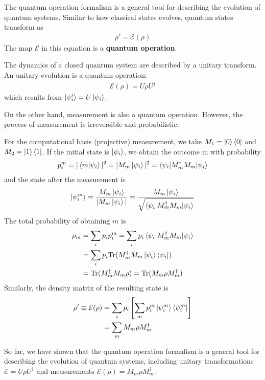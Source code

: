 The quantum operation formalism is a general tool for describing the evolution of quantum systems. Similar to how classical states evolves, quantum states transform as
\begin{align*}
    \rho'=\mathcal{E}(\rho)
\end{align*}
The map $\mathcal{E}$ in this equation is a \textbf{quantum operation}.

The dynamics of a closed quantum system are described by a unitary transform. An unitary evolution is a quantum operation:
\begin{align*}
    \mathcal{E}(\rho)=U\rho U^\dagger
\end{align*}
which results from $\ket{\psi_i'}=U\ket{\psi_i}$. 

On the other hand, measurement is also a quantum operation. However, the process of measurement is irreversible and probabilistic. 

For the computational basis (projective) measurement, we take $M_1 = \ket{0}\bra{0}$ and $M_2 = \ket{1}\bra{1}$. If the initial state is $\ket{\psi_i}$, we obtain the outcome m with probability
\begin{align*}
    p_i^m=|\braket{m|\psi_i}|^2=|M_m\ket{\psi_i}|^2=\braket{\psi_i|M_m^\dagger M_m|\psi_i}
\end{align*}
and the state after the measurement is
\begin{align*}
    \ket{\psi_i^m}=\frac{M_m\ket{\psi_i}}{|M_m\ket{\psi_i}|}=\frac{M_m\ket{\psi_i}}{\sqrt{\braket{\psi_i|M_m^\dagger M_m|\psi_i}}}
\end{align*}
The total probability of obtaining $m$ is
\begin{align*}
    \rho_m&=\sum_i p_i p_i^m=\sum_i p_i \braket{\psi_i|M_m^\dagger M_m|\psi_i}\\
    &=\sum_i p_i \mathrm{Tr}(M_m^\dagger M_m \ket{\psi_i}\bra{\psi_i})\\
    &=\mathrm{Tr}(M_m^\dagger M_m \rho)=\mathrm{Tr}(M_m\rho M_m^\dagger)
\end{align*}
Similarly, the density matrix of the resulting state is
\begin{align*}
    \rho'\equiv\mathcal{E}(\rho)&=\sum_i p_i\left[ \sum_m p_i^m \ket{\psi_i^m}\bra{\psi_i^m} \right]\\
    &=\sum_m M_m \rho M_m^\dagger
\end{align*}

So far, we have shown that the quantum operation formalism is a general tool for describing the evolution of quantum systems, including unitary transformations $\mathcal{E}=U\rho U^\dagger$ and measurements $\mathcal{E}(\rho)=M_m \rho M_m^\dagger$. 

